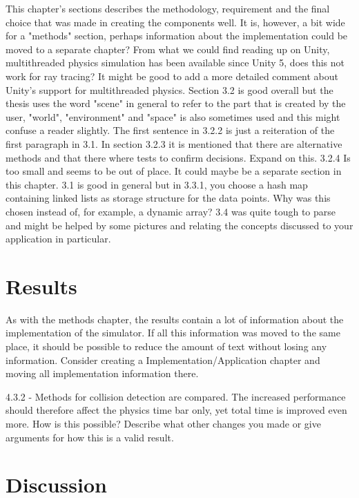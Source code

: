 \documentclass[12pt,a4paper,twoside,openright]{report}
\begin{document}
	This chapter's sections describes the methodology, requirement and the
	final choice that was made in creating the components well. It is, however,
	a bit wide for a "methods" section, perhaps information about the
	implementation could be moved to a separate chapter?  From what we could
	find reading up on Unity, multithreaded physics simulation has been
	available since Unity 5, does this not work for ray tracing? It might be
	good to add a more detailed comment about Unity's support for multithreaded
	physics. Section 3.2 is good overall but the thesis uses the word "scene"
	in general to refer to the part that is created by the user, "world",
	"environment" and "space" is also sometimes used and this might confuse a
	reader slightly. The first sentence in 3.2.2 is just a reiteration of the
	first paragraph in 3.1. In section 3.2.3 it is mentioned that there are
	alternative methods and that there where tests to confirm decisions. Expand
	on this.  3.2.4 Is too small and seems to be out of place.  It could maybe
	be a separate section in this chapter. 3.1 is good in general but in 3.3.1,
	you choose a hash map containing linked lists as storage structure for the
	data points. Why was this chosen instead of, for example, a dynamic array?
	3.4 was quite tough to parse and might be helped by some pictures and
	relating the concepts discussed to your application in particular.

\section*{Results}

	As with the methods chapter, the results contain a lot of information about
	the implementation of the simulator. If all this information was moved to
	the same place, it should be possible to reduce the amount of text without
	losing any information. Consider creating a Implementation/Application 
	chapter and moving all implementation information there.
	
	4.3.2 - Methods for collision detection are compared. The increased 
	performance should therefore affect the physics time bar only, yet total 
	time is improved even more. How is this possible? Describe what other 
	changes you made or give arguments for how this is a valid result.

\section*{Discussion}
\end{document}
